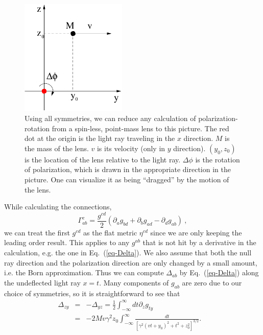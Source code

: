 \documentclass[aps,showpacs,twocolumn,floats,prd,superscriptaddress,nofootinbib]{revtex4-1}
\begin{document}
\begin{figure}
\includegraphics[width=0.45\textwidth]{rotation.pdf}
\caption{\label{fig:rotation}
Using all symmetries, we can reduce any calculation of polarization-rotation from a spin-less, point-mass lens to this picture.
The red dot at the origin is the light ray traveling in the $x$ direction.
$M$ is the mass of the lens.
$v$ is its velocity (only in $y$ direction).
$(y_0,z_0)$ is the location of the lens relative to the light ray.
$\Delta\phi$ is the rotation of polarization, which is drawn in the appropriate direction in the picture.
One can visualize it as being ``dragged'' by the motion of the lens.
}
\end{figure}

While calculating the connections,
\begin{equation}
\Gamma_{ab}^c = \frac{g^{cd}}{2}\left(\partial_a g_{bd} + \partial_b g_{ad} - \partial_d g_{ab} \right)~,
\end{equation}
we can treat the first $g^{cd}$ as the flat metric $\eta^{cd}$ since we are only keeping the leading order result. 
This applies to any $g^{ab}$ that is not hit by a derivative in the calculation, e.g. the one in Eq.~(\ref{eq-Delta}).
We also assume that both the null ray direction and the polarization direction are only changed by a small amount, i.e. the Born approximation. 
Thus we can compute $\Delta_{ab}$ by Eq.~(\ref{eq-Delta}) along the undeflected light ray $x=t$.
Many components of $g_{ab}$ are zero due to our choice of symmetries, so it is straightforward to see that
\begin{eqnarray}
\Delta_{zy} &=& -\Delta_{yz} = \frac{1}{2}\int_{-\infty}^{\infty} dt \partial_z g_{ty} \nonumber \\
&=&-2Mv\gamma^2 z_0 \int_{-\infty}^{\infty}
\frac{dt}{\left[\gamma^2(vt+y_0)^2+t^2 + z_0^2\right]^{3/2}}. ~~~~
\end{eqnarray}
\end{document}
